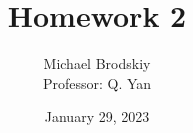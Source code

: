 


\title{Homework 2}
\date{January 29, 2023}
\author{Michael Brodskiy\\ \small Professor: Q. Yan}



\maketitle

\newpage

